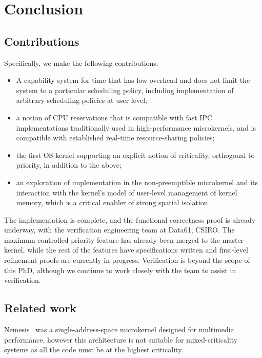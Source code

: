 \chapter{Conclusion}
\label{chap:conclusion}

\section{Contributions}

Specifically, we make the following contributions:
\begin{itemize}
\item A capability system for time that has low overhead and does not
  limit the system to a particular scheduling policy, including
  implementation of arbitrary scheduling policies at user level;
\item a notion of CPU reservations that is compatible with
  fast IPC implementations traditionally used in high-performance
  microkernels, and is compatible with established real-time resource-sharing policies;
\item the first OS kernel supporting an explicit notion of
  criticality, orthogonal to priority, in addition to the above;
\item an exploration of implementation in the non-preemptible \selfour
  microkernel and its interaction with the kernel's model of
  user-level management of kernel memory, which is a critical enabler
  of strong spatial isolation.
\end{itemize}

The implementation is complete, and the functional correctness proof is already underway, with the
verification engineering team at Data61, CSIRO. The maximum controlled
priority feature has already been merged to the master kernel, while the rest of the features have
specifications written and first-level refinement proofs are currently in progress. Verification is
beyond the scope of this PhD, although we continue to work closely with the team to assist in
verification. 

\section{Related work}

Nemesis~\citep{Leslie_MBRBEFH_96} was a single-address-space microkernel designed for multimedia
performance, however this architecture is not suitable for mixed-criticality systems as all the
code must be at the highest criticality.

